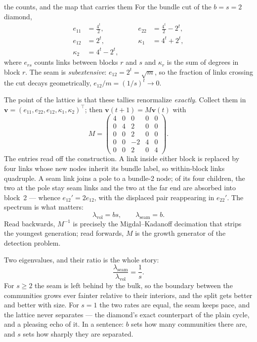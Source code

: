 \begin{calculation}{the counts, and the map that carries them}
For the bundle cut of the $b=s=2$ diamond,
\begin{equation}
\begin{aligned}
  e_{11} &= \tfrac{4^t}{2}, &\qquad e_{22} &= \tfrac{4^t}{2}-2^t, \\
  e_{12} &= 2^t, &\qquad
  \kappa_1 &= 4^t+2^t, \\
  \kappa_2 &= 4^t-2^t, & &
\end{aligned}
\label{eq:com-diacounts}
\end{equation}
where $e_{rs}$ counts links between blocks $r$ and $s$ and $\kappa_r$ is the sum
of degrees in block $r$. The seam is \emph{subextensive}: $e_{12}=2^t=\sqrt{m}$,
so the fraction of links crossing the cut decays geometrically,
$e_{12}/m=(1/s)^t\to0$.

The point of the lattice is that these tallies renormalize \emph{exactly}. Collect
them in $\mathbf{v}=(e_{11},e_{22},e_{12},\kappa_1,\kappa_2)^{\top}$; then
$\mathbf{v}(t{+}1)=M\mathbf{v}(t)$ with
\begin{equation}
  M=\begin{pmatrix}
     4&0&0&0&0\\ 0&4&2&0&0\\ 0&0&2&0&0\\ 0&0&-2&4&0\\ 0&0&2&0&4
    \end{pmatrix}.
  \label{eq:com-M}
\end{equation}
The entries read off the construction. A link inside either block is replaced by
four links whose new nodes inherit its bundle label, so within-block links
quadruple. A seam link joins a pole to a bundle-2 node; of its four children, the
two at the pole stay seam links and the two at the far end are absorbed into
block~2 --- whence $e_{12}'=2e_{12}$, with the displaced pair reappearing in
$e_{22}'$. The spectrum is what matters:
\begin{equation}
  \lambda_{\mathrm{vol}} = bs, \qquad \lambda_{\mathrm{seam}} = b .
  \label{eq:com-eigen}
\end{equation}
Read backwards, $M^{-1}$ is precisely the Migdal--Kadanoff decimation that strips
the youngest generation; read forwards, $M$ is the growth generator of the
detection problem.
\end{calculation}

Two eigenvalues, and their ratio is the whole story:
\begin{equation}
  \frac{\lambda_{\mathrm{seam}}}{\lambda_{\mathrm{vol}}} = \frac{1}{s} .
  \label{eq:com-gap}
\end{equation}
For $s\ge2$ the seam is left behind by the bulk, so the boundary between the
communities grows ever fainter relative to their interiors, and the split gets
better and better with size. For $s=1$ the two rates are equal, the seam keeps
pace, and the lattice never separates --- the diamond's exact counterpart of the
plain cycle, and a pleasing echo of it. In a sentence: $b$ sets how many
communities there are, and $s$ sets how sharply they are separated.

